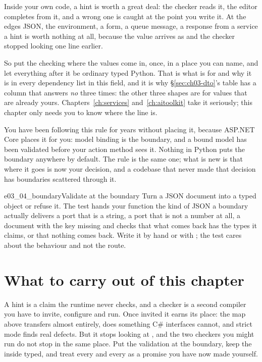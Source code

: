 
\noindent
Inside your own code, a hint is worth a great deal: the checker reads it, the
editor completes from it, and a wrong one is caught at the point you write
it. At the edges \dash{} JSON, the environment, a form, a queue message, a
response from a service \dash{} a hint is worth nothing at all, because the
value arrives as  and the checker stopped looking one line earlier.

So put the checking where the values come in, once, in a place you can name,
and let everything after it be ordinary typed Python. That is what
 is for and why it is in every dependency list in this field,
and it is why \S\ref{sec:ch03-dto}'s table has a column that answers
\emph{no} three times: the other three shapes are for values that are already
yours. Chapters~\ref{ch:services} and~\ref{ch:aitoolkit} take it seriously;
this chapter only needs you to know where the line is.

\begin{csbox}
You have been following this rule for years without placing it, because
ASP.NET Core places it for you: model binding is the boundary, and a bound
model has been validated before your action method sees it. Nothing in
Python puts the boundary anywhere by default. The rule is the same one; what
is new is that where it goes is now your decision, and a codebase that never
made that decision has boundaries scattered through it.
\end{csbox}

\begin{exercise}{e03_04_boundary}{Validate at the boundary}
Turn a JSON document into a typed object or refuse it. The test hands your
function the kind of JSON a boundary actually delivers \dash{} a port that is
a string, a port that is not a number at all, a document with the key missing
\dash{} and checks that what comes back has the types it claims, or that
nothing comes back. Write it by hand or with ; the test cares
about the behaviour and not the route.
\end{exercise}

\section{What to carry out of this chapter}
\label{sec:ch03-summary}

A hint is a claim the runtime never checks, and a checker is a second
compiler you have to invite, configure and run. Once invited it earns its
place: the map above transfers almost entirely,  does something
C\# interfaces cannot, and strict mode finds real defects. But it stops
looking at , and the two checkers you might run do not stop in the
same place. Put the validation at the boundary, keep the inside typed, and
treat every  and every  as a promise you have
now made yourself.
